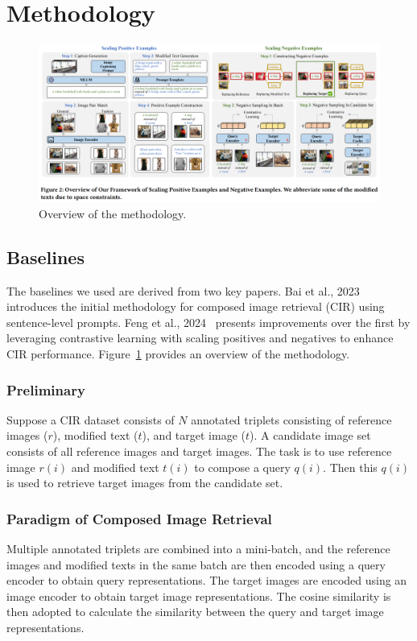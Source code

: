 \FloatBarrier
\section{Methodology}

\begin{figure}[t]
    \centering
    \includegraphics[width=\textwidth]{figures/overview.png}
    \caption{Overview of the methodology.}
    \label{fig:methodology_overview}
\end{figure}

\subsection{Baselines}

The baselines we used are derived from two key papers. Bai et al., 2023~\cite{bai2023sentencelevelpromptsbenefitcomposed} introduces the initial methodology for composed image retrieval (CIR) using sentence-level prompts. Feng et al., 2024~\cite{feng2024improvingcomposedimageretrieval} presents improvements over the first by leveraging contrastive learning with scaling positives and negatives to enhance CIR performance. Figure~\ref{fig:methodology_overview} provides an overview of the methodology.

\subsubsection{Preliminary}
Suppose a CIR dataset consists of \(N\) annotated triplets consisting of reference images (\(r\)), modified text (\(t\)), and target image (\(t\)). A candidate image set consists of all reference images and target images. The task is to use reference image \(r(i)\) and modified text \(t(i)\) to compose a query \(q(i)\). Then this \(q(i)\) is used to retrieve target images from the candidate set.

\subsubsection{Paradigm of Composed Image Retrieval}
Multiple annotated triplets are combined into a mini-batch, and the reference images and modified texts in the same batch are then encoded using a query encoder to obtain query representations. The target images are encoded using an image encoder to obtain target image representations. The cosine similarity is then adopted to calculate the similarity between the query and target image representations.

